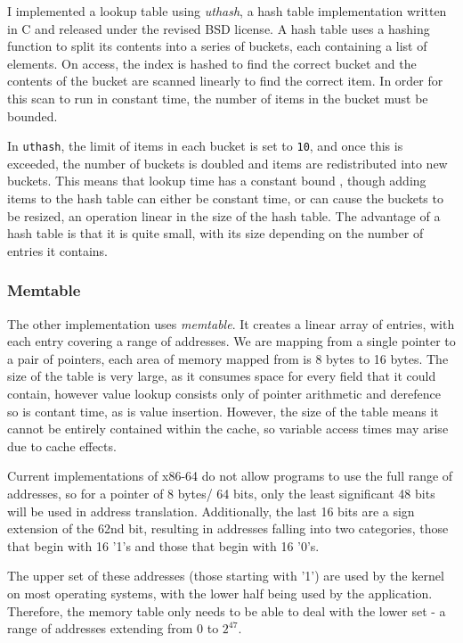 I implemented a lookup table using \textit{uthash}, a hash table implementation written in C and released under the revised BSD license. 
A hash table uses a hashing function to split its contents into a series of buckets, each containing a list of elements.
On access, the index is hashed to find the correct bucket and the contents of the bucket are scanned linearly to find the correct item.
In order for this scan to run in constant time, the number of items in the bucket must be bounded.

In \verb!uthash!, the limit of items in each bucket is set to \verb!10!, and once this is exceeded, the number of buckets is doubled and items are redistributed into new buckets.
This means that lookup time has a constant bound 
, though adding items to the hash table can either be constant time, or can cause the buckets to be resized, an operation linear in the size of the hash table.
The advantage of a hash table is that it is quite small, with its size depending on the number of entries it contains.

\subsubsection{Memtable}

The other implementation uses \textit{memtable}.
It creates a linear array of entries, with each entry covering a range of addresses.
We are mapping from a single pointer to a pair of pointers, each area of memory mapped from is 8 bytes to 16 bytes.
The size of the table is very large, as it consumes space for every field that it could contain, however value lookup consists only of pointer arithmetic and derefence so is contant time, as is value insertion.
However, the size of the table means it cannot be entirely contained within the cache, so variable access times may arise due to cache effects.

Current implementations of x86-64 do not allow programs to use the full range of addresses, so for a pointer of 8 bytes/ 64 bits, only the least significant 48 bits will be used in address translation.
Additionally, the last 16 bits are a sign extension of the 62nd bit, resulting in addresses falling into two categories, those that begin with 16 '1's and those that begin with 16 '0's.

The upper set of these addresses (those starting with '1') are used by the kernel on most operating systems, with the lower half being used by the application.
Therefore, the memory table only needs to be able to deal with the lower set - a range of addresses extending from $0$ to $2^{47}$.

